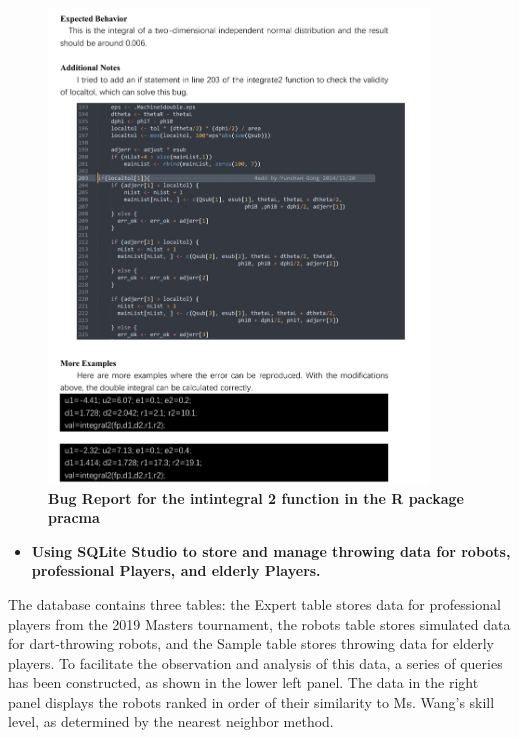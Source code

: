 \documentclass[cjjs]{ipart}
\theoremstyle{plain}
\begin{document}
\begin{figure}[H]
    \centering
    \includegraphics[width=0.90\textwidth]{12.png} 
    \caption{\textbf{Bug Report for the intintegral 2 function in the R package pracma}}
    \label{fig:dartboard}
\end{figure}
\newpage
\begin{itemize}
    \item \textbf{Using SQLite Studio to store and manage throwing data for robots, professional Players, and elderly Players.} 
\end{itemize} 

\text The database contains three tables: the Expert table stores data for professional players from the 2019 Masters tournament, the robots table stores simulated data for dart-throwing robots, and the Sample table stores throwing data for elderly players. To facilitate the observation and analysis of this data, a series of queries has been constructed, as shown in the lower left panel. The data in the right panel displays the robots ranked in order of their similarity to Ms. Wang's skill level, as determined by the nearest neighbor method.
\end{document}
